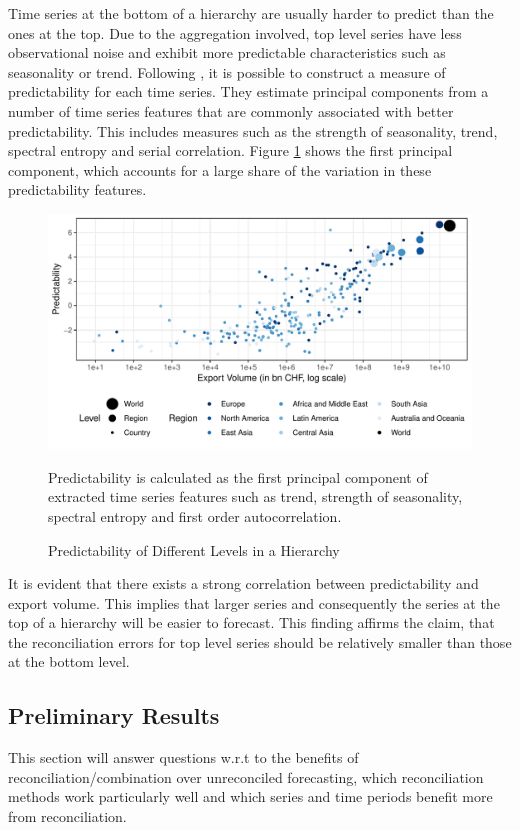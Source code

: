\documentclass[a4paper,fleqn,11pt]{article}
\begin{document}
Time series at the bottom of a hierarchy are usually harder to predict than the ones at the top. Due to the aggregation involved, top level series have less observational noise and exhibit more predictable characteristics such as seasonality or trend. Following \cite{Kang2017}, it is possible to construct a measure of predictability for each time series. They estimate principal components from a number of time series features that are commonly associated with better predictability. This includes measures such as the strength of seasonality, trend, spectral entropy and serial correlation. Figure \ref{fig:feature} shows the first principal component, which accounts for a large share of the variation in these predictability features.
\begin{figure}[H]
	\includegraphics[width=\textwidth]{fig/fig_confetti}
	\caption{Predictability of Different Levels in a Hierarchy} \label{fig:feature}
	\footnotesize{Predictability is calculated as the first principal component of extracted time series features such as trend, strength of seasonality, spectral entropy and first order autocorrelation.}
\end{figure}
It is evident that there exists a strong correlation between predictability and export volume. This implies that larger series and consequently the series at the top of a hierarchy will be easier to forecast. This finding affirms the claim, that the reconciliation errors for top level series should be relatively smaller than those at the bottom level.

\clearpage

\subsection{Preliminary Results}
This section will answer questions w.r.t to the benefits of reconciliation/combination over unreconciled forecasting, which reconciliation methods work particularly well and which series and time periods benefit more from reconciliation.\\
 
\end{document}

